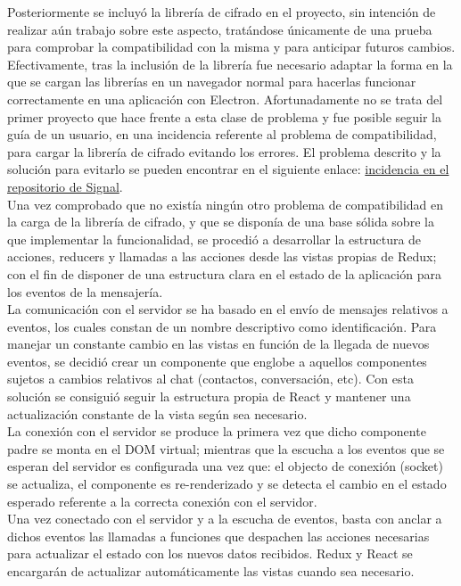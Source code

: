Posteriormente se incluyó la librería de cifrado en el proyecto, sin intención de realizar aún trabajo sobre este aspecto, tratándose únicamente de una prueba para comprobar la compatibilidad con la misma y para anticipar futuros cambios. Efectivamente, tras la inclusión de la librería fue necesario adaptar la forma en la que se cargan las librerías en un navegador normal para hacerlas funcionar correctamente en una aplicación con Electron. Afortunadamente no se trata del primer proyecto que hace frente a esta clase de problema y fue posible seguir la guía de un usuario, en una incidencia referente al problema de compatibilidad, para cargar la librería de cifrado evitando los errores. El problema descrito y la solución para evitarlo se pueden encontrar en el siguiente enlace:
\href{https://github.com/WhisperSystems/libsignal-protocol-javascript/issues/6}{incidencia en el repositorio de Signal}. \\

Una vez comprobado que no existía ningún otro problema de compatibilidad en la carga de la librería de cifrado, y que se disponía de una base sólida sobre la que implementar la funcionalidad, se procedió a desarrollar la estructura de acciones, reducers y llamadas a las acciones desde las vistas propias de Redux; con el fin de disponer de una estructura clara en el estado de la aplicación para los eventos de la mensajería. \\

La comunicación con el servidor se ha basado en el envío de mensajes relativos a eventos, los cuales constan de un nombre descriptivo como identificación. Para manejar un constante cambio en las vistas en función de la llegada de nuevos eventos, se decidió crear un componente que englobe a aquellos componentes sujetos a cambios relativos al chat (contactos, conversación, etc). Con esta solución se consiguió seguir la estructura propia de React y mantener una actualización constante de la vista según sea necesario. \\

La conexión con el servidor se produce la primera vez que dicho componente padre se monta en el DOM virtual; mientras que la escucha a los eventos que se esperan del servidor es configurada una vez que: el objecto de conexión (socket) se actualiza, el componente es re-renderizado y se detecta el cambio en el estado esperado referente a la correcta conexión con el servidor. \\

Una vez conectado con el servidor y a la escucha de eventos, basta con anclar a dichos eventos las llamadas a funciones que despachen las acciones necesarias para actualizar el estado con los nuevos datos recibidos. Redux y React se encargarán de actualizar automáticamente las vistas cuando sea necesario. \\

